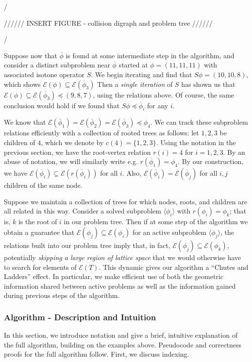\documentclass[11pt,reqno]{amsart}
\theoremstyle{definition}
\numberwithin{equation}{section}
\newcommand{\ol}{\overline}
\newcommand{\lag}{\langle}
\newcommand{\rag}{\rangle}
\newcommand{\pre}{\phi}
\newcommand{\sub}{\subseteq}
\newcommand{\fix}{\mathcal{E}}
\newcommand{\peq}{\preceq}
\newcommand{\toppre}{\ol{\pre}}
\begin{document}
/

////// INSERT FIGURE - collision digraph and problem tree //////

/


Suppose now that $\toppre$ is found at some intermediate step in the algorithm, and consider a distinct subproblem near $\toppre$ started at $\pre = (11,11,11)$ with associated isotone operator $S$.
We begin iterating and find that $S \pre = (10,10,8)$, which shows $\fix(\pre) \sub \fix(\toppre_3)$ 
Then a \emph{single iteration} of $S$ has shown us that $\fix(\pre) \sub \fix(\toppre_3) \peq (9,8,7)$, using the relations above. 
Of course, the same conclusion would hold if we found that  $S \pre \peq \toppre_i$ for any $i$. 

We know that $\fix(\toppre_1) = \fix(\toppre_2) = \fix(\toppre_3) \peq \pre_4$. 
We can track these subproblem relations efficiently with a collection of rooted trees as follows: let $1,2,3$ be children of $4$, which we denote by $c(4) = \{1,2,3\}$.
Using the notation in the previous section, we have the root-vertex relation $r(i) = 4$ for $i = 1,2,3$. 
By an abuse of notation, we will similarly write e.g. $r(\toppre_1) = \pre_4$. 
By our construction, we have $\fix(\toppre_i) \sub \fix(r(\toppre_i))$ for all $i$. 
Also, $\fix(\toppre_i) = \fix(\toppre_j)$ for all $i,j$ children of the same node. 

Suppose we maintain a collection of trees for which nodes, roots, and children are all related in this way. 
Consider a solved subproblem $\lag \pre_i \rag$ with $r(\pre_i) = \pre_k$; that is, $k$ is the root of $i$ in our problem tree.
Then if at some step of the algorithm we obtain a guarantee that $\fix(\pre_j) \sub \fix(\pre_i)$ for an active subproblem $\lag \pre_j \rag$, the relations built into our problem tree imply that, in fact, $\fix(\pre_j) \sub \fix(\pre_k)$, potentially \emph{skipping a large region of lattice space} that we would otherwise have to search for elements of $\fix(T)$. 
This dynamic gives our algorithm a ``Chutes and Ladders'' effect. 
In particular, we make efficient use of both the geometric information shared between active problems as well as the information gained during previous steps of the algorithm. 

\subsubsection{Algorithm - Description and Intuition} 

In this section, we introduce notation and give a brief, intuitive explanation of the full algorithm, building on the examples above.
Pseudocode and correctness proofs for the full algorithm follow. 
First, we discuss indexing. 
\end{document}

